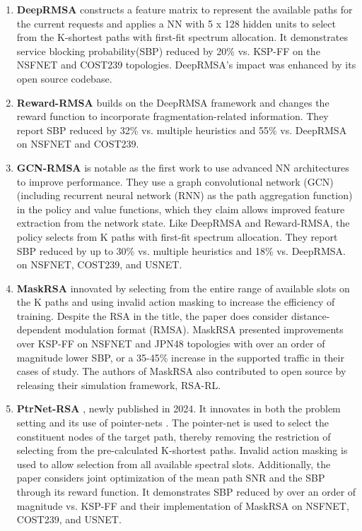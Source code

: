 \begin{enumerate}[itemsep=0pt]
    \item \textbf{DeepRMSA} \cite{chen_deeprmsa_2019} constructs a feature matrix to represent the available paths for the current requests and applies a NN with 5 x 128 hidden units to select from the K-shortest paths with first-fit spectrum allocation. It demonstrates service blocking probability(SBP) reduced by 20\% vs. KSP-FF on the NSFNET and COST239 topologies. DeepRMSA's impact was enhanced by its open source codebase. %
    \item \textbf{Reward-RMSA} \cite{tang_heuristic_2022} builds on the DeepRMSA framework and changes the reward function to incorporate fragmentation-related information. They report SBP reduced by 32\% vs. multiple heuristics and 55\% vs. DeepRMSA on NSFNET and COST239. %
    \item \textbf{GCN-RMSA} \cite{xu_deep_2022} is notable as the first work to use advanced NN architectures to improve performance. They use a graph convolutional network (GCN) (including recurrent neural network (RNN) as the path aggregation function) in the policy and value functions, which they claim allows improved feature extraction from the network state. Like DeepRMSA and Reward-RMSA, the policy selects from K paths with first-fit spectrum allocation. They report SBP reduced by up to 30\% vs. multiple heuristics and 18\% vs. DeepRMSA. on NSFNET, COST239, and USNET. %
    \item \textbf{MaskRSA} \cite{shimoda_mask_2021} innovated by selecting from the entire range of available slots on the K paths and using invalid action masking \cite{huang_closer_2020} to increase the efficiency of training. Despite the RSA in the title, the paper does consider distance-dependent modulation format (RMSA). MaskRSA presented improvements over KSP-FF on NSFNET and JPN48 topologies with over an order of magnitude lower SBP, or a 35-45\% increase in the supported traffic in their cases of study. The authors of MaskRSA also contributed to open source by releasing their simulation framework, RSA-RL. %
    \item \textbf{PtrNet-RSA} \cite{cheng_ptrnet-rsa_2024}, newly published in 2024. It innovates in both the problem setting and its use of pointer-nets \cite{vinyals_pointer_2015}. The pointer-net is used to select the constituent nodes of the target path, thereby removing the restriction of selecting from the pre-calculated K-shortest paths. Invalid action masking is used to allow selection from all available spectral slots. Additionally, the paper considers joint optimization of the mean path SNR and the SBP through its reward function. It demonstrates SBP reduced by over an order of magnitude vs. KSP-FF and their implementation of MaskRSA on NSFNET, COST239, and USNET.
\end{enumerate}


